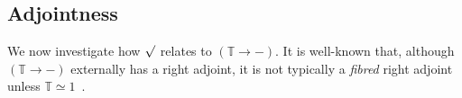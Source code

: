 \documentclass[10pt]{article}
\makeatletter
\theoremstyle{definition}
\let\oldequiv\equiv%
\renewcommand{\equiv}{\simeq}
\newcommand{\defeq}{\oldequiv}
\newcommand*{\univ}{\mathcal{U}}
\def\prdsym{\prod}
\newcommand{\@theprd}[1]{\prdsym_{(#1)}}
\newcommand{\prd}[1]{\@ifnextchar\bgroup{\@prd{#1}\prd}{\@prd{#1}}}
\newcommand{\@prd}[1]{\mathchoice{{\textstyle\@theprd{#1}}}{\@theprd{#1}}{\@theprd{#1}}{\@theprd{#1}}}
\newcommand{\lock}{\mathchoice {\scalebox{0.8}{\text{\faLock}}}
  {\scalebox{0.8}{\text{\faLock}}} {\scalebox{0.5}{\text{\faLock}}}
  {\scalebox{0.4}{\text{\faLock}}} }
\newcommand{\key}{\mathchoice
  {\scalebox{0.8}{\text{\faKey}}} {\scalebox{0.8}{\text{\faKey}}}
  {\scalebox{0.5}{\text{\faKey}}} {\scalebox{0.4}{\text{\faKey}}} }
\newcommand{\rbindsym}{%
  \mathchoice
    {\reflectbox{\rotatebox[origin=c]{185}{$\lambda$}}}  %
    {\reflectbox{\rotatebox[origin=c]{185}{$\lambda$}}}  %
    {\reflectbox{\rotatebox[origin=c]{185}{$\scriptstyle\lambda$}}}  %
    {\reflectbox{\rotatebox[origin=c]{185}{$\scriptscriptstyle\lambda$}}}  %
  }
\newcommand{\Tiny}{\mathbb{T}}
\newcommand{\lockn}[1]{\mathcal{#1}}
\newcommand{\varkeye}[2]{\key_{#1}^{#2}}
\newcommand{\varkey}[2]{\varkeye{\lockn{#1}}{#2}}
\newcommand{\admkeye}[2]{\overrightarrow{\key}_{#1}^{#2}}
\newcommand{\admkey}[2]{\admkeye{\lockn{#1}}{#2}}
\newcommand{\rformsym}{\surd}
\newcommand{\rforme}[2]{\ThisStyle{\raisebox{0.07em}{$\SavedStyle \rformsym_{\hspace{-0.25em}#1}$}} #2}
\newcommand{\rform}[2]{\rforme{\lockn{#1}}{#2}}
\newcommand{\rformu}[1]{\ThisStyle{\raisebox{0.07em}{$\SavedStyle \rformsym$}} #1}
\newcommand{\rintroe}[2]{\lock_{#1}. #2}
\newcommand{\rintro}[2]{\rintroe{\lockn{#1}}{#2}}
\newcommand{\relim}[1]{\rbindsym #1}
\newcommand{\rget}[1]{{#1}_{\downharpoonleft}}
\makeatother
\begin{document}

\subsection{Adjointness}\label{sec:adjointness}

We now investigate how $\rformu$ relates to $(\Tiny \to -)$. It is
well-known that, although $(\Tiny \to -)$ externally has a right
adjoint, it is not typically a \emph{fibred} right adjoint unless
$\Tiny \equiv 1$~\cite{yetter:tiny, kock:commutation}.
\end{document}
